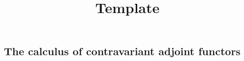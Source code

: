 \documentclass[../../solutions]{subfiles}
\title{Template}
\author{}
\begin{document}
\maketitle

\subsection{The calculus of contravariant adjoint functors}
\end{document}
